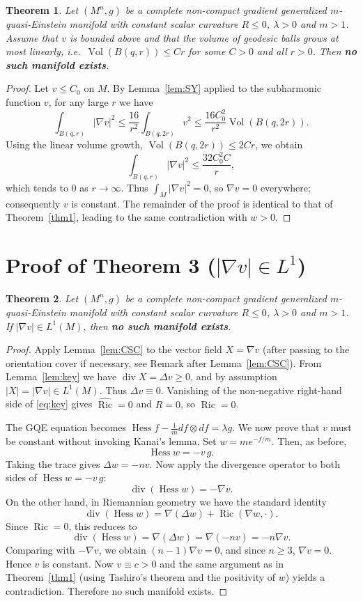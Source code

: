 \documentclass[12pt,a4paper]{article}
\newcommand{\Ric}{\operatorname{Ric}}
\newcommand{\Hess}{\operatorname{Hess}}
\newcommand{\divg}{\operatorname{div}}
\newcommand{\Vol}{\operatorname{Vol}}
\newtheorem{theorem}{Theorem}[section]
\theoremstyle{definition}
\theoremstyle{definition}
\begin{document}
\begin{theorem}\label{thm2}
Let $(M^n,g)$ be a complete non-compact gradient generalized $m$-quasi-Einstein manifold with constant scalar curvature $R\le 0$, $\lambda>0$ and $m>1$.
Assume that $v$ is bounded above and that the volume of geodesic balls grows at most linearly, i.e.\ $\Vol(B(q,r)) \le C r$ for some $C>0$ and all $r>0$.
Then \textbf{no such manifold exists}.
\end{theorem}

\begin{proof}
Let $v\le C_0$ on $M$.
By Lemma~\ref{lem:SY} applied to the subharmonic function $v$, for any large $r$ we have
\[
\int_{B(q,r)}|\nabla v|^2 \le \frac{16}{r^2}\int_{B(q,2r)} v^2
\le \frac{16 C_0^2}{r^2}\Vol(B(q,2r)).
\]
Using the linear volume growth, $\Vol(B(q,2r))\le 2C r$, we obtain
\[
\int_{B(q,r)}|\nabla v|^2 \le \frac{32 C_0^2 C}{r},
\]
which tends to $0$ as $r\to\infty$.
Thus $\int_M |\nabla v|^2 = 0$, so $\nabla v=0$ everywhere; consequently $v$ is constant.
The remainder of the proof is identical to that of Theorem~\ref{thm1}, leading to the same contradiction with $w>0$.
\end{proof}

\section{Proof of Theorem 3 ($|\nabla v|\in L^1$)}
\label{sec:thm3}

\begin{theorem}\label{thm3}
Let $(M^n,g)$ be a complete non-compact gradient generalized $m$-quasi-Einstein manifold with constant scalar curvature $R\le 0$, $\lambda>0$ and $m>1$.
If $|\nabla v|\in L^1(M)$, then \textbf{no such manifold exists}.
\end{theorem}

\begin{proof}
Apply Lemma~\ref{lem:CSC} to the vector field $X = \nabla v$ (after passing to the orientation cover if necessary, see Remark after Lemma~\ref{lem:CSC}).
From Lemma~\ref{lem:key} we have $\divg X = \Delta v \ge 0$, and by assumption $|X| = |\nabla v|\in L^1(M)$.
Thus $\Delta v \equiv 0$.
Vanishing of the non-negative right-hand side of \eqref{eq:key} gives $\hat{\Ric}=0$ and $R=0$, so $\Ric=0$.

The GQE equation becomes $\Hess f - \frac1m df\otimes df = \lambda g$. 
We now prove that $v$ must be constant without invoking Kanai's lemma.
Set $w = m e^{-f/m}$. Then, as before,
\[
\Hess w = -v\,g.
\]
Taking the trace gives $\Delta w = -n v$.
Now apply the divergence operator to both sides of $\Hess w = -v\,g$:
\[
\divg(\Hess w) = -\nabla v.
\]
On the other hand, in Riemannian geometry we have the standard identity
\[
\divg(\Hess w) = \nabla(\Delta w) + \Ric(\nabla w, \cdot).
\]
Since $\Ric=0$, this reduces to
\[
\divg(\Hess w) = \nabla(\Delta w) = \nabla(-n v) = -n\nabla v.
\]
Comparing with $-\nabla v$, we obtain $(n-1)\nabla v = 0$, and since $n\ge 3$, $\nabla v = 0$. Hence $v$ is constant.
Now $v\equiv c>0$ and the same argument as in Theorem~\ref{thm1} (using Tashiro's theorem and the positivity of $w$) yields a contradiction.
Therefore no such manifold exists.
\end{proof}
\end{document}
